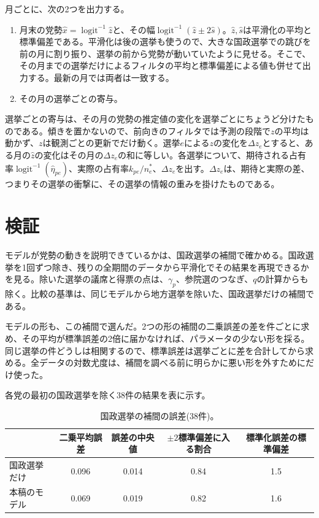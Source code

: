\documentclass[a4paper,11pt]{ltjsarticle}
\begin{document}
月ごとに、次の2つを出力する。

\begin{enumerate}
  \item 月末の党勢$\hat x=\operatorname{logit}^{-1}\hat z$と、その幅$\operatorname{logit}^{-1}(\hat z\pm2\hat s)$。$\hat z,\hat s$は平滑化の平均と標準偏差である。平滑化は後の選挙も使うので、大きな国政選挙での跳びを前の月に割り振り、選挙の前から党勢が動いていたように見せる。そこで、その月までの選挙だけによるフィルタの平均と標準偏差による値も併せて出力する。最新の月では両者は一致する。
  \item その月の選挙ごとの寄与。
\end{enumerate}

選挙ごとの寄与は、その月の党勢の推定値の変化を選挙ごとにちょうど分けたものである。傾きを置かないので、前向きのフィルタでは予測の段階で$z$の平均は動かず、$z$は観測ごとの更新でだけ動く。選挙$e$による$z$の変化を$\Delta z_e$とすると、ある月の$\hat z$の変化はその月の$\Delta z_e$の和に等しい。各選挙について、期待される占有率$\operatorname{logit}^{-1}(\hat\eta_{pe})$、実際の占有率$k_{pe}/n^\ast_e$、$\Delta z_e$を出す。$\Delta z_e$は、期待と実際の差、つまりその選挙の衝撃に、その選挙の情報の重みを掛けたものである。

\section{検証}
\label{sec:valid}

モデルが党勢の動きを説明できているかは、国政選挙の補間で確かめる。国政選挙を1回ずつ除き、残りの全期間のデータから平滑化でその結果を再現できるかを見る。除いた選挙の議席と得票の点は、$\gamma_p$、参院選のつなぎ、$q$の計算からも除く。比較の基準は、同じモデルから地方選挙を除いた、国政選挙だけの補間である。

モデルの形も、この補間で選んだ。2つの形の補間の二乗誤差の差を件ごとに求め、その平均が標準誤差の2倍に届かなければ、パラメータの少ない形を採る。同じ選挙の件どうしは相関するので、標準誤差は選挙ごとに差を合計してから求める。全データの対数尤度は、補間を調べる前に明らかに悪い形を外すためにだけ使った。

各党の最初の国政選挙を除く38件の結果を表に示す。

\begin{table}[h]
\centering
\begin{tabular}{lcccc}
\hline
 & 二乗平均誤差 & 誤差の中央値 & $\pm2$標準偏差に入る割合 & 標準化誤差の標準偏差 \\
\hline
国政選挙だけ & 0.096 & 0.014 & 0.84 & 1.5 \\
本稿のモデル & 0.069 & 0.019 & 0.82 & 1.6 \\
\hline
\end{tabular}
\caption{国政選挙の補間の誤差(38件)。}
\end{table}
\end{document}
